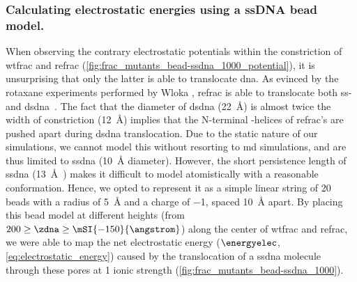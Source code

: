 \subsubsection{Calculating electrostatic energies using a ssDNA bead model.}
%
When observing the contrary electrostatic potentials within the constriction of \gls{wtfrac} and \gls{refrac}
(\cref{fig:frac_mutants_bead-ssdna_1000_potential}), it is unsurprising that only the latter is able to
translocate \gls{dna}. As evinced by the rotaxane experiments performed by Wloka \etal{}, \gls{refrac} is able
to translocate both ss- and \gls{dsdna}~\cite{Wloka-2016}. The fact that the diameter of \gls{dsdna}
(\SI{22}{\angstrom}) is almost twice the width of constriction (\SI{12}{\angstrom}) implies that the
N-terminal \ta-helices of \gls{refrac}'s are pushed apart during \gls{dsdna} translocation. Due to the static
nature of our simulations, we cannot model this without resorting to \gls{md} simulations, and are thus
limited to \gls{ssdna} (\SI{10}{\angstrom} diameter). However, the short persistence length of \gls{ssdna}
(\SI{13}{\angstrom}~\cite{Tinland-1997}) makes it difficult to model atomistically with a reasonable
conformation. Hence, we opted to represent it as a simple linear string of 20 beads with a radius of
\SI{5}{\angstrom} and a charge of \SI{-1}{\ec}, spaced \SI{10}{\angstrom} apart. By placing this bead model at
different heights (from $200 \ge \zdna \ge \mSI{-150}{\angstrom}$) along the center of \gls{wtfrac} and
\gls{refrac}, we were able to map the net electrostatic energy ($\energyelec$, \cref{eq:electrostatic_energy})
caused by the translocation of a \gls{ssdna} molecule through these pores at \SI{1}{\Molar} ionic strength
(\cref{fig:frac_mutants_bead-ssdna_1000}). 

